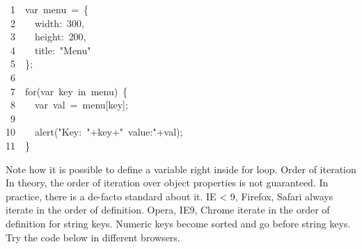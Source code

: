 \documentclass{article}
\begin{document}
\begin{mdpre}%
\noindent~{1}~~{var}~menu~=~\{\\
~{2}~~~~width:~{300},\\
~{3}~~~~height:~{200},\\
~{4}~~~~title:~{"}{Menu}{"}\\
~{5}~~\};\\
~{6}\\
~{7}~~{for}({var}~key~{in}~menu)~\{\\
~{8}~~~~{var}~val~=~menu{}[key];\\
~{9}\\
{10}~~~~alert({"}{Key:~}{"}+key+{"}{~value:}{"}+val);\\
{11}~~\}%
\end{mdpre}\noindent{}Note how it is possible to define a variable right inside for loop.
Order of iteration
In theory, the order of iteration over object properties is not guaranteed. In practice, there is a de-facto standard about it. 
IE \textless{} 9, Firefox, Safari always iterate in the order of definition.
Opera, IE9, Chrome iterate in the order of definition for string keys.
Numeric keys become sorted and go before string keys.
Try the code below in different browsers. 
\end{document}
